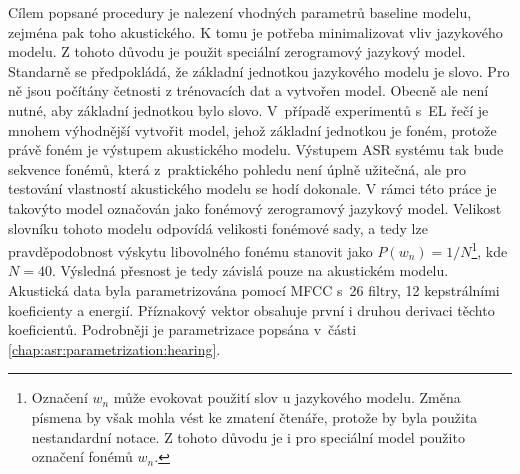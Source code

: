 Cílem popsané procedury je nalezení vhodných parametrů baseline modelu, zejména pak toho akustického.
K tomu je potřeba minimalizovat vliv jazykového modelu.
Z tohoto důvodu je použit speciální zerogramový jazykový model.
Standarně se předpokládá, že základní jednotkou jazykového modelu je slovo.
Pro ně jsou počítány četnosti z trénovacích dat a vytvořen model.
Obecně ale není nutné, aby základní jednotkou bylo slovo. V~případě experimentů s~EL řečí je mnohem výhodnější vytvořit model, jehož základní jednotkou je foném, protože právě foném je výstupem akustického modelu.
Výstupem ASR systému tak bude sekvence fonémů, která z~praktického pohledu není úplně užitečná, ale pro testování vlastností akustického modelu se hodí dokonale.
V rámci této práce je takovýto model označován jako fonémový zerogramový jazykový model.
Velikost slovníku tohoto modelu odpovídá velikosti fonémové sady, a tedy lze pravděpodobnost výskytu libovolného fonému stanovit jako $P(w_n) = 1/N$\footnote{Označení $w_n$ může evokovat použití slov u jazykového modelu. Změna písmena by však mohla vést ke zmatení čtenáře, protože by byla použita nestandardní notace. Z tohoto důvodu je i pro speciální model použito označení fonémů $w_n$.}, kde $N=40$.
Výsledná přesnost je tedy závislá pouze na akustickém modelu.
Akustická data byla parametrizována pomocí MFCC s~26 filtry, 12 kepstrálními koeficienty a energií.
Příznakový vektor obsahuje první i druhou derivaci těchto koeficientů.
Podrobněji je parametrizace popsána v~části \ref{chap:asr:parametrization:hearing}.






